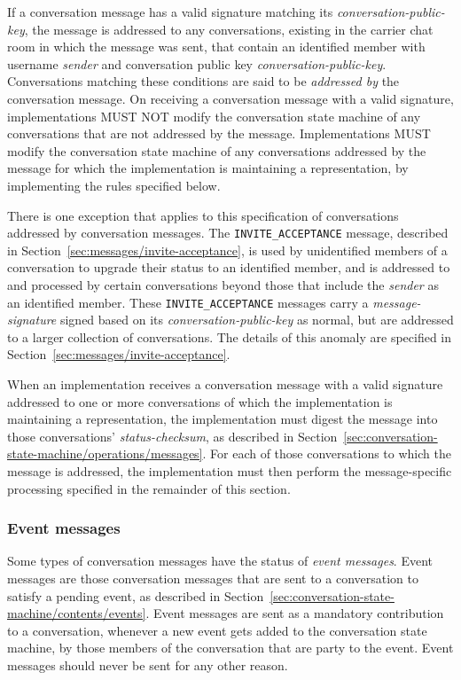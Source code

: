 \documentclass{article}
\def\message#1{\texttt{#1}}
\def\field#1{\textit{#1}}
\def\smfield#1{\textsl{#1}}
\begin{document}
If a conversation message has a valid signature matching its \field{conversation-public-key}, the message is addressed to any conversations, existing in the carrier chat room in which the message was sent, that contain an identified member with username \field{sender} and conversation public key \field{conversation-public-key}.
Conversations matching these conditions are said to be \emph{addressed by} the conversation message.
On receiving a conversation message with a valid signature, implementations MUST NOT modify the conversation state machine of any conversations that are not addressed by the message.
Implementations MUST modify the conversation state machine of any conversations addressed by the message for which the implementation is maintaining a representation, by implementing the rules specified below.

There is one exception that applies to this specification of conversations addressed by conversation messages.
The \message{INVITE\_ACCEPTANCE} message, described in Section~\ref{sec:messages/invite-acceptance}, is used by unidentified members of a conversation to upgrade their status to an identified member, and is addressed to and processed by certain conversations beyond those that include the \field{sender} as an identified member.
These \message{INVITE\_ACCEPTANCE} messages carry a \field{message-signature} signed based on its \field{conversation-public-key} as normal, but are addressed to a larger collection of conversations.
The details of this anomaly are specified in Section~\ref{sec:messages/invite-acceptance}.

When an implementation receives a conversation message with a valid signature addressed to one or more conversations of which the implementation is maintaining a representation, the implementation must digest the message into those conversations' \smfield{status-checksum}, as described in Section~\ref{sec:conversation-state-machine/operations/messages}.
For each of those conversations to which the message is addressed, the implementation must then perform the message-specific processing specified in the remainder of this section.


\subsubsection{Event messages}
\label{sec:messages/event-messages}

Some types of conversation messages have the status of \emph{event messages}.
Event messages are those conversation messages that are sent to a conversation to satisfy a pending event, as described in Section~\ref{sec:conversation-state-machine/contents/events}.
Event messages are sent as a mandatory contribution to a conversation, whenever a new event gets added to the conversation state machine, by those members of the conversation that are party to the event.
Event messages should never be sent for any other reason.
\end{document}
